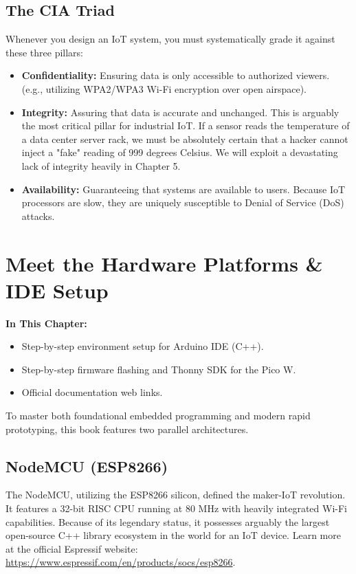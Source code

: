 \section{The CIA Triad}
Whenever you design an IoT system, you must systematically grade it against these three pillars:
\begin{itemize}
    \item \textbf{Confidentiality:} Ensuring data is only accessible to authorized viewers. (e.g., utilizing WPA2/WPA3 Wi-Fi encryption over open airspace).
    \item \textbf{Integrity:} Assuring that data is accurate and unchanged. This is arguably the most critical pillar for industrial IoT. If a sensor reads the temperature of a data center server rack, we must be absolutely certain that a hacker cannot inject a "fake" reading of 999 degrees Celsius. We will exploit a devastating lack of integrity heavily in Chapter 5.
    \item \textbf{Availability:} Guaranteeing that systems are available to users. Because IoT processors are slow, they are uniquely susceptible to Denial of Service (DoS) attacks.
\end{itemize}

\chapter{Meet the Hardware Platforms \& IDE Setup}

\textbf{In This Chapter:}
\begin{itemize}
    \item Step-by-step environment setup for Arduino IDE (C++).
    \item Step-by-step firmware flashing and Thonny SDK for the Pico W.
    \item Official documentation web links.
\end{itemize}

To master both foundational embedded programming and modern rapid prototyping, this book features two parallel architectures.

\section{NodeMCU (ESP8266)}
The NodeMCU, utilizing the ESP8266 silicon, defined the maker-IoT revolution. It features a 32-bit RISC CPU running at 80 MHz with heavily integrated Wi-Fi capabilities. Because of its legendary status, it possesses arguably the largest open-source C++ library ecosystem in the world for an IoT device. Learn more at the official Espressif website: \url{https://www.espressif.com/en/products/socs/esp8266}.

